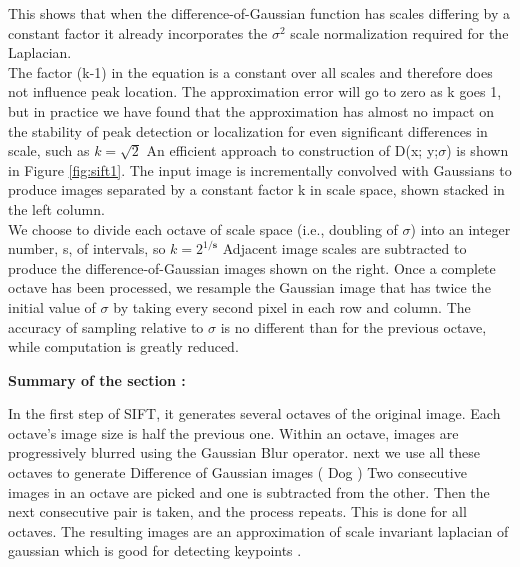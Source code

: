This shows that when the difference-of-Gaussian function has scales differing by a constant
factor it already incorporates the  $\sigma ^2 $
scale normalization required for the Laplacian. \\The
factor (k-1) in the equation is a constant over all scales and therefore does not influence
peak location. The approximation error will go to zero as k goes 1, but in practice we have
found that the approximation has almost no impact on the stability of peak detection or
localization for even significant differences in scale, such as $k= \sqrt{2}$
An efficient approach to construction of D(x; y;$\sigma$) is shown in Figure \ref{fig:sift1}. The input image
is incrementally convolved with Gaussians to produce images separated by a constant
factor k in scale space, shown stacked in the left column. \\We choose to divide each octave
of scale space (i.e., doubling of $\sigma$) into an integer number, s, of intervals, so $k = 2^{1/\mathbf{s}}$
Adjacent image scales are subtracted to produce the difference-of-Gaussian images shown
on the right. Once a complete octave has been processed, we resample the Gaussian image
that has twice the initial value of $\sigma$ by taking every second pixel in each row and column. \newline
\newline
The accuracy of sampling relative to $\sigma$ is no different than for the previous octave, while
computation is greatly reduced.

\textbf{Summary of the section :}

In the first step of SIFT, it generates several octaves of the original image. Each octave's image size is half the previous one. Within an octave, images are progressively blurred using the Gaussian Blur operator.
next we use all these octaves to generate Difference of Gaussian images ( Dog ) Two consecutive images in an octave are picked and one is subtracted from the other. Then the next consecutive pair is taken, and the process repeats. This is done for all octaves. The resulting images are an approximation of scale invariant laplacian of gaussian which is good for detecting keypoints .


